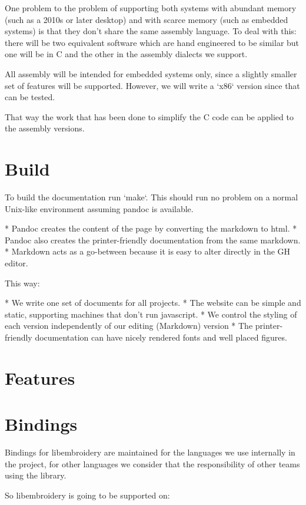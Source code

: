 \documentclass{report}
\begin{document}
One problem to the problem of supporting both systems with abundant memory
(such as a 2010s or later desktop) and with scarce memory (such as embedded
systems) is that they don't share the same assembly language. To deal with
this: there will be two equivalent software which are hand engineered to be
similar but one will be in C and the other in the assembly dialects we support.

All assembly will be intended for embedded systems only, since a slightly
smaller set of features will be supported. However, we will write a
`x86` version since that can be tested.

That way the work that has been done to simplify the C code can be applied to
the assembly versions.

\section{Build}

To build the documentation run `make`. This should run no problem on a normal Unix-like environment
assuming pandoc is available.

* Pandoc creates the content of the page by converting the markdown to html.
* Pandoc also creates the printer-friendly documentation from the same markdown.
* Markdown acts as a go-between because it is easy to alter directly in the GH editor.

This way:

* We write one set of documents for all projects.
* The website can be simple and static, supporting machines that don't run javascript.
* We control the styling of each version independently of our editing (Markdown) version
* The printer-friendly documentation can have nicely rendered fonts and well placed figures.

\section{Features}

\section{Bindings}

Bindings for libembroidery are maintained for the languages we use internally in the project, for other languages we consider that the responsibility of other teams using the library.

So libembroidery is going to be supported on:
\end{document}
